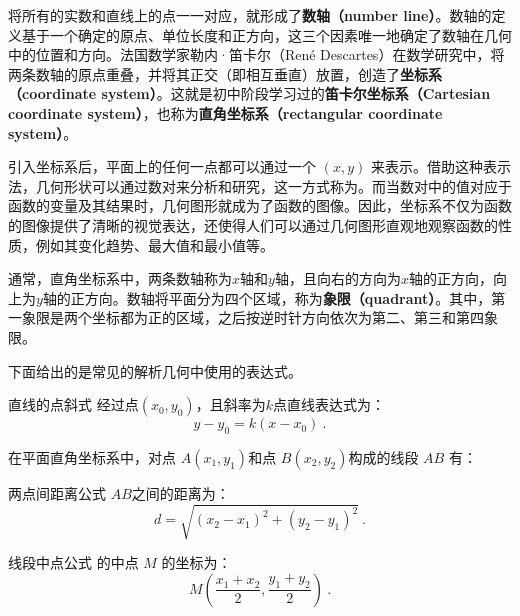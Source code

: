 将所有的实数和直线上的点一一对应，就形成了\textbf{数轴（number line）}。数轴的定义基于一个确定的原点、单位长度和正方向，这三个因素唯一地确定了数轴在几何中的位置和方向。法国数学家勒内·笛卡尔（René Descartes）在数学研究中，将两条数轴的原点重叠，并将其正交（即相互垂直）放置，创造了\textbf{坐标系（coordinate system）}。这就是初中阶段学习过的\textbf{笛卡尔坐标系（Cartesian coordinate system）}，也称为\textbf{直角坐标系（rectangular coordinate system）}。

引入坐标系后，平面上的任何一点都可以通过一个 $(x, y)$ 来表示。借助这种表示法，几何形状可以通过数对来分析和研究，这一方式称为。而当数对中的值对应于函数的变量及其结果时，几何图形就成为了函数的图像。因此，坐标系不仅为函数的图像提供了清晰的视觉表达，还使得人们可以通过几何图形直观地观察函数的性质，例如其变化趋势、最大值和最小值等。

通常，直角坐标系中，两条数轴称为$x$轴和$y$轴，且向右的方向为$x$轴的正方向，向上为$y$轴的正方向。数轴将平面分为四个区域，称为\textbf{象限（quadrant）}。其中，第一象限是两个坐标都为正的区域，之后按逆时针方向依次为第二、第三和第四象限。

下面给出的是常见的解析几何中使用的表达式。

\begin{definition}{直线的点斜式}\label{def_HsGeBa_1}
经过点$(x_0,y_0)$，且斜率为$k$点直线表达式为：
\begin{equation}
y-y_0=k(x-x_0)~.
\end{equation}
\end{definition}

在平面直角坐标系中，对点 $A(x_1, y_1)$和点  $B(x_2, y_2) $构成的线段  $AB$  有：
\begin{definition}{两点间距离公式}
$AB$之间的距离为：
\begin{equation}
d = \sqrt{(x_2 - x_1)^2 + (y_2 - y_1)^2}~.
\end{equation}
\end{definition}
\begin{definition}{线段中点公式}
的中点  $M$  的坐标为：
\begin{equation}
M \left( \frac{x_1 + x_2}{2}, \frac{y_1 + y_2}{2} \right)~.
\end{equation}
\end{definition}
